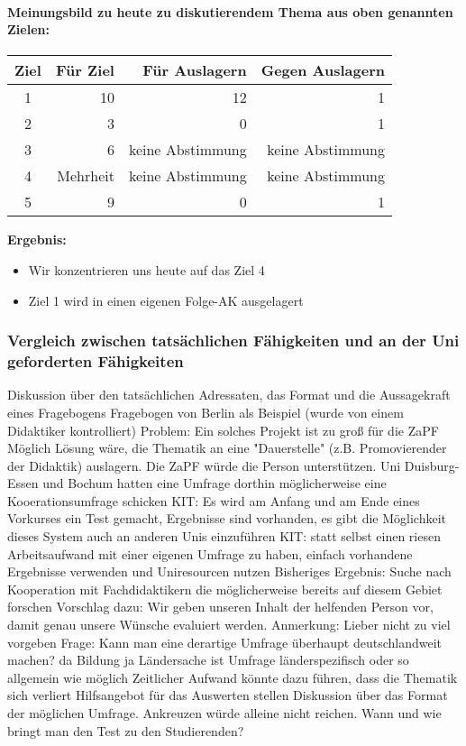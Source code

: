 			\paragraph{Meinungsbild zu heute zu diskutierendem Thema aus oben genannten Zielen:}
				\begin{tabular}{c|r|r|r}
					Ziel & Für Ziel	& Für Auslagern	& Gegen Auslagern  \\ \hline
					1 &	10 & 12	& 1 \\
					2	& 3	& 0	& 1 \\
					3	& 6	& keine Abstimmung & keine Abstimmung \\
					4 &	Mehrheit & keine Abstimmung &	keine Abstimmung \\
					5 &	9	& 0	& 1
				\end{tabular}

				\textbf{Ergebnis:}
				\begin{itemize}
					\item Wir konzentrieren uns heute auf das Ziel 4
					\item Ziel 1 wird in einen eigenen Folge-AK ausgelagert
				\end{itemize}

		\subsubsection*{Vergleich zwischen tatsächlichen Fähigkeiten und an der Uni geforderten Fähigkeiten}
			\begin{outline}
				\1 Diskussion über den tatsächlichen Adressaten, das Format und die Aussagekraft eines Fragebogens
				\1 Fragebogen von Berlin als Beispiel (wurde von einem Didaktiker kontrolliert)
				\1 Problem: Ein solches Projekt ist zu groß für die ZaPF
					\2 Möglich Lösung wäre, die Thematik an eine "Dauerstelle" (z.B. Promovierender der Didaktik) auslagern. Die ZaPF würde die Person unterstützen.
					\2 Uni Duisburg-Essen und Bochum hatten eine Umfrage dorthin möglicherweise eine Kooerationsumfrage schicken
					\2 KIT: Es wird am Anfang und am Ende eines Vorkurses ein Test gemacht, Ergebnisse sind vorhanden, es gibt die Möglichkeit dieses System auch an anderen Unis einzuführen
					\2 KIT: statt selbst einen riesen Arbeitsaufwand mit einer eigenen Umfrage zu haben, einfach vorhandene Ergebnisse verwenden und Uniresourcen nutzen
					\2 Bisheriges Ergebnis: Suche nach Kooperation mit Fachdidaktikern die möglicherweise bereits auf diesem Gebiet forschen
					\2 Vorschlag dazu: Wir geben unseren Inhalt der helfenden Person vor, damit genau unsere Wünsche evaluiert werden.
						\3 Anmerkung: Lieber nicht zu viel vorgeben
				\1 Frage: Kann man eine derartige Umfrage überhaupt deutschlandweit machen? da Bildung ja Ländersache ist
					\2 Umfrage länderspezifisch oder so allgemein wie möglich
					\2 Zeitlicher Aufwand könnte dazu führen, dass die Thematik sich verliert
				\1 Hilfsangebot für das Auswerten stellen
				\1 Diskussion über das Format der möglichen Umfrage. Ankreuzen würde alleine nicht reichen.
				\1 Wann und wie bringt man den Test zu den Studierenden?
			\end{outline}

